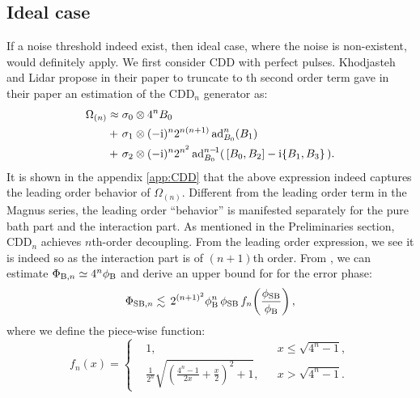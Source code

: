 \documentclass[pra,reprint,superscriptaddress]{revtex4-2}
\newcommand{\CDDn}{\mathrm{CDD}_n}
\begin{document}
\subsection{Ideal case}
If a noise threshold indeed exist, then ideal case, where the noise is non-existent, would definitely apply. 
We first consider CDD with perfect pulses. Khodjasteh and Lidar propose in their paper to truncate to th second order term
gave in their paper an estimation of the $\CDDn$ generator as:
\begin{align}\label{eq:cdd-generator-est}
\Omega_{(n)} 
\approx {} & \sigma_0 \otimes 4^n B_0 \notag \\
+\ & \sigma_1 \otimes (-\mathrm{i})^{n} 2^{n(n+1)} \operatorname{ad}_{B_0}^{n}(B_1)\\ 
+\ & \sigma_2 \otimes (-\mathrm{i})^{n} 2^{n^2} \operatorname{ad}_{B_0}^{n-\!1}( \,[B_0,B_2] - \mathrm{i} \{B_1,B_3\} \,). \notag
\end{align} 
It is shown in the appendix \ref{app:CDD} that the above expression indeed captures the leading order behavior of $\Omega_{(n)}$. Different from the leading order term in the Magnus series, the leading order ``behavior'' is manifested separately for the pure bath part and the interaction part.  As mentioned in the Preliminaries section, $\CDDn$ achieves $n$th-order decoupling.  From the leading order expression, we see it is indeed so as the interaction part is of $(n+1)$th order.
From , we can 
estimate $\Phi_{\mathrm{B},n} \simeq 4^n\phi_{\mathrm{B}}$ and derive an upper bound for for the error phase:
\begin{equation}
\Phi_{\mathrm{SB},n} \lesssim \,
2^{(n+1)^2} \phi_{\mathrm{B}}^{n}\,\phi_{\mathrm{SB}} \,f_n\!\left(\frac{\phi_{\mathrm{SB}}}{\phi_{\mathrm{B}}}\right),
\end{equation}
where we define the piece-wise function:
\begin{equation}
 f_n(x) =\left\{
 \begin{aligned}
 &1, && x \le  \sqrt{4^n-1}, \\
 &\frac{1}{2^n} \sqrt{\left(\frac{4^n-1}{2x}+\frac{x}{2}\right)^2+1}, &&
 x > \sqrt{4^n-1}.
 \end{aligned}
 \right.
\end{equation}
\end{document}
